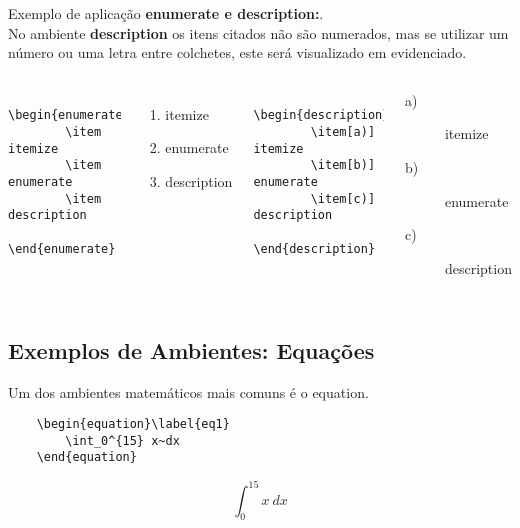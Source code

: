\begin{frame}[fragile]
Exemplo de aplicação {\bf enumerate e description:}.\\
No ambiente {\bf description} os itens citados não são numerados, 
mas se utilizar um número ou uma letra entre colchetes, este será visualizado em evidenciado.
\vspace*{-0.5cm}
\begin{columns}
\column[t]{5cm}
\begin{verbatim}
    \begin{enumerate}
        \item itemize
        \item enumerate
        \item description
    \end{enumerate}
\end{verbatim}
\begin{enumerate}
\item itemize
\item enumerate
\item description
\end{enumerate}

\column[t]{6cm}
\begin{verbatim}
    \begin{description}
        \item[a)] itemize
        \item[b)] enumerate
        \item[c)] description
    \end{description}
\end{verbatim}
\begin{description}
\item[a)] itemize
\item[b)] enumerate
\item[c)] description
\end{description}
\end{columns}
\end{frame}


\subsection*{Exemplos de Ambientes: Equações} %

\begin{frame}[fragile]
    Um dos ambientes matemáticos mais comuns é o {\code equation}.

\vspace{0.5cm}
\begin{CenteredBox}
\begin{lstlisting}
    \begin{equation}\label{eq1}
        \int_0^{15} x~dx
    \end{equation}
\end{lstlisting}
\end{CenteredBox}

    \begin{equation}\label{eq1}
        \int_0^{15} x~dx
    \end{equation}
\end{frame}

